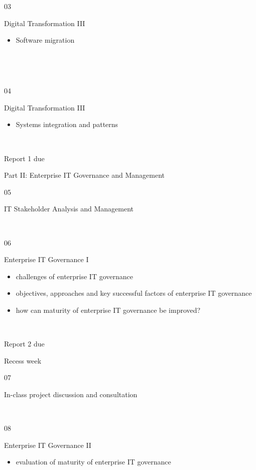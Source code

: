 ~

~

{03}

{Digital Transformation III}

\begin{itemize}
\tightlist
\item
  {Software migration}
\end{itemize}

~

~

{04}

{Digital Transformation III}

\begin{itemize}
\tightlist
\item
  {Systems integration and patterns}
\end{itemize}

~

{Report 1 due}

{Part II: Enterprise IT Governance and Management}

{05}

{IT Stakeholder Analysis and Management}\\
\hspace*{0.333em}

~

{06}

{Enterprise IT Governance I}

\begin{itemize}
\tightlist
\item
  {challenges of enterprise IT governance}
\item
  {objectives, approaches and key successful factors of enterprise IT
  governance}
\end{itemize}

\begin{itemize}
\tightlist
\item
  {how can maturity of enterprise IT governance be improved?}
\end{itemize}

~

{Report 2 due}

{Recess week}

{07}

{In-class project discussion and consultation}

~

{08}

{Enterprise IT Governance II}

\begin{itemize}
\tightlist
\item
  {evaluation of maturity of enterprise IT governance}
\end{itemize}

